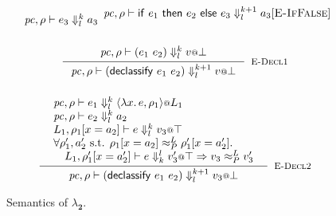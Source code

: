 \documentclass{article}
\makeatletter
\theoremstyle{definition}
\newcommand{\at}{\ensuremath{{\scriptstyle{@}}}}
\newcommand{\pc}{\ensuremath{{\mathit{pc}}}}
\makeatother
\begin{document}
\begin{figure}[ht]
\begin{gather*}
{{\begin{array}{l}
          \\
          \pc, \rho |- e_3 \Downarrow^{k}_{l} a_3
        \end{array}}
    }{
      \pc, \rho |-
      \mathsf{if}\ e_1\ \mathsf{then}\ e_2\ \mathsf{else}\ e_3
      \Downarrow^{k+1}_{l}
      a_3
    }[\textsc{E-IfFalse}]
    \\[3ex]
    \inference{
      {\begin{array}{l}
          \pc, \rho |-
          (e_1\ e_2)
          \Downarrow^{k}_{l}
          v \at \bot
        \end{array}}
    }{
      \pc, \rho |-
      (\mathsf{declassify}\ e_1\ e_2)
      \Downarrow^{k+1}_{l}
      v \at \bot
    }[\textsc{E-Decl1}]
    \\[3ex]
    \inference{
      {\begin{array}{l}
          \pc, \rho |-
          e_1
          \Downarrow^{k}_{l}
          \langle{\lambda{x}.\, e, \rho_1\rangle} \at L_1
          \\
          \pc, \rho |-
          e_2
          \Downarrow^{k}_{l}
          a_2
          \\
          L_1, \rho_1[x = a_2] |-
          e
          \Downarrow^{k}_{l}
          v_3 \at \top
          \\
          \forall{\rho_1', a_2' \text{ s.t. }
            \rho_1[x = a_2] \approx^{L}_{P} \rho_1'[x = a_2']}.
          \\\quad
          L_1, \rho_1'[x = a_2'] |-
          e
          \Downarrow^{l}_{k}
          v_3' \at \top =>
          v_3 \approx^{L}_{P} v_3'
        \end{array}}
    }{
      \pc, \rho |-
      (\mathsf{declassify}\ e_1\ e_2)
      \Downarrow^{k+1}_{l}
      v_3 \at \bot
    }[\textsc{E-Decl2}]
  \end{gather*}
  \caption{Semantics of $\lambda_{\mathbf{2}}$.}
  \label{fig:semantics}
\end{figure}
\end{document}
